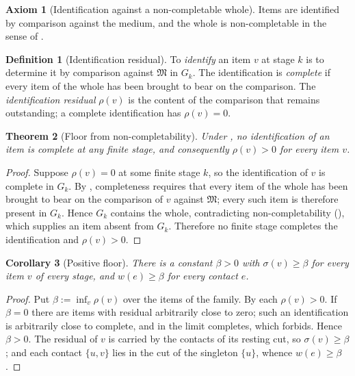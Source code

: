 \documentclass[11pt,a4paper]{article}
\theoremstyle{thmstyle}
\newtheorem{theorem}{Theorem}[section]
\newtheorem{corollary}[theorem]{Corollary}
\theoremstyle{definition}
\newtheorem{definition}[theorem]{Definition}
\newtheorem{axiom}{Axiom}
\theoremstyle{remark}
\newcommand{\med}{\mathfrak{M}}
\newcommand{\Gph}{G}
\newcommand{\wt}{w}
\newcommand{\flo}{\beta}
\newcommand{\res}{\rho}
\newcommand{\sep}{\sigma}
\begin{document}
\begin{axiom}[Identification against a non-completable whole]
\label{ax:noncomp}
Items are identified by comparison against the medium, and the whole is
non-completable in the sense of .
\end{axiom}

\begin{definition}[Identification residual]
\label{def:residual}
To \emph{identify} an item $v$ at stage $k$ is to determine it by comparison
against $\med$ in $\Gph_k$. The identification is \emph{complete} if every
item of the whole has been brought to bear on the comparison. The
\emph{identification residual} $\res(v)$ is the content of the comparison
that remains outstanding; a complete identification has $\res(v)=0$.
\end{definition}

\begin{theorem}[Floor from non-completability]
\label{thm:floor-derived}
Under , no identification of an item is complete at any
finite stage, and consequently $\res(v)>0$ for every item $v$.
\end{theorem}

\begin{proof}
Suppose $\res(v)=0$ at some finite stage $k$, so the identification of $v$
is complete in $\Gph_k$. By , completeness requires that
every item of the whole has been brought to bear on the comparison of $v$
against $\med$; every such item is therefore present in $\Gph_k$. Hence
$\Gph_k$ contains the whole, contradicting non-completability
(), which supplies an item absent from $\Gph_k$. Therefore
no finite stage completes the identification and $\res(v)>0$.
\end{proof}

\begin{corollary}[Positive floor]
\label{cor:floor}
There is a constant $\flo>0$ with $\sep(v)\ge\flo$ for every item $v$ of
every stage, and $\wt(e)\ge\flo$ for every contact $e$.
\end{corollary}

\begin{proof}
Put $\flo:=\inf_v\res(v)$ over the items of the family. By
 each $\res(v)>0$. If $\flo=0$ there are items with
residual arbitrarily close to zero; such an identification is arbitrarily
close to complete, and in the limit completes, which
 forbids. Hence $\flo>0$. The residual of $v$ is
carried by the contacts of its resting cut, so $\sep(v)\ge\flo$; and each
contact $\{u,v\}$ lies in the cut of the singleton $\{u\}$, whence
$\wt(e)\ge\flo$.
\end{proof}
\end{document}
